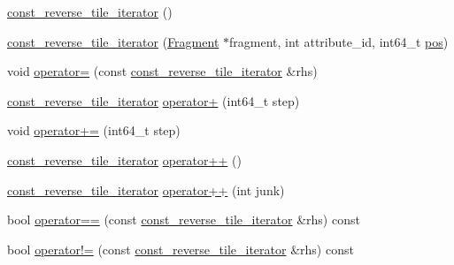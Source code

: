 \begin{DoxyCompactItemize}
\item 
\hyperlink{classStorageManager_1_1Fragment_1_1const__reverse__tile__iterator_a06fe98466870526119832623ad6d3fdd}{const\+\_\+reverse\+\_\+tile\+\_\+iterator} ()
\item 
\hyperlink{classStorageManager_1_1Fragment_1_1const__reverse__tile__iterator_a9d3c964b04dcd2693d4420be0b818c8a}{const\+\_\+reverse\+\_\+tile\+\_\+iterator} (\hyperlink{classStorageManager_1_1Fragment}{Fragment} $\ast$fragment, int attribute\+\_\+id, int64\+\_\+t \hyperlink{classStorageManager_1_1Fragment_1_1const__reverse__tile__iterator_a85167ad3a57775d0671e4fa8b5d2490f}{pos})
\item 
void \hyperlink{classStorageManager_1_1Fragment_1_1const__reverse__tile__iterator_a5241add0082d4d76133e57f00ed25dc3}{operator=} (const \hyperlink{classStorageManager_1_1Fragment_1_1const__reverse__tile__iterator}{const\+\_\+reverse\+\_\+tile\+\_\+iterator} \&rhs)
\item 
\hyperlink{classStorageManager_1_1Fragment_1_1const__reverse__tile__iterator}{const\+\_\+reverse\+\_\+tile\+\_\+iterator} \hyperlink{classStorageManager_1_1Fragment_1_1const__reverse__tile__iterator_a550180339fba3ecd4606425439ad9eac}{operator+} (int64\+\_\+t step)
\item 
void \hyperlink{classStorageManager_1_1Fragment_1_1const__reverse__tile__iterator_a76cb1ceaf4db3a9532beb1d443723ecd}{operator+=} (int64\+\_\+t step)
\item 
\hyperlink{classStorageManager_1_1Fragment_1_1const__reverse__tile__iterator}{const\+\_\+reverse\+\_\+tile\+\_\+iterator} \hyperlink{classStorageManager_1_1Fragment_1_1const__reverse__tile__iterator_ac8cf874a2cf8cde7fd601234b2bcca95}{operator++} ()
\item 
\hyperlink{classStorageManager_1_1Fragment_1_1const__reverse__tile__iterator}{const\+\_\+reverse\+\_\+tile\+\_\+iterator} \hyperlink{classStorageManager_1_1Fragment_1_1const__reverse__tile__iterator_a8d786d428892b95baf6e7b60934c48e7}{operator++} (int junk)
\item 
bool \hyperlink{classStorageManager_1_1Fragment_1_1const__reverse__tile__iterator_aa7ae270213de4de4b695de1a4e10157a}{operator==} (const \hyperlink{classStorageManager_1_1Fragment_1_1const__reverse__tile__iterator}{const\+\_\+reverse\+\_\+tile\+\_\+iterator} \&rhs) const 
\item 
bool \hyperlink{classStorageManager_1_1Fragment_1_1const__reverse__tile__iterator_a7c197c8bd0a7318f4565d75b1eb16a9c}{operator!=} (const \hyperlink{classStorageManager_1_1Fragment_1_1const__reverse__tile__iterator}{const\+\_\+reverse\+\_\+tile\+\_\+iterator} \&rhs) const 

\end{DoxyCompactItemize}
